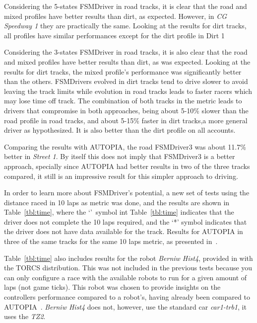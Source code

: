 Considering the 5-states FSMDriver in road tracks, it is clear that the road and mixed profiles have better results than dirt, as expected. However, in \emph{CG Speedway 1} they are practically the same.  Looking at the results for dirt tracks, all profiles have similar performances except for the dirt profile in Dirt 1 

Considering the 3-states FSMDriver in road tracks, it is also clear that the road and mixed profiles have better results than dirt, as was expected.  Looking at the results for dirt tracks, the mixed profile's performance was significantly better than the others. FSMDrivers evolved in dirt tracks tend to drive slower to avoid leaving the track limits while evolution in road tracks leads to faster racers which may lose time off track. The combination of both tracks in the metric leads to drivers that compromise in both approaches, being about 5-10\% slower than the road profile in road tracks, and about 5-15\% faster in dirt tracks,a more general driver as hypothesized. It is also better than the dirt profile on all accounts.

Comparing the results with AUTOPIA, the road FSMDriver3 was about 11.7\% better in \emph{Street 1}. By itself this does not imply that FSMDriver3 is a better approach, specially since AUTOPIA had better results in two of the three tracks compared, it still is an impressive result for this simpler approach to driving.

In order to learn more about FSMDriver's potential, a new set of tests using the distance raced in 10 laps as metric was done, and the results are shown in Table~\ref{tbl:time}, where the `\textdagger'~symbol int Table~\ref{tbl:time} indicates that the driver does not complete the 10 laps required, and the `*' symbol indicates that the driver does not have data available for the track. Results for AUTOPIA in three of the same tracks for the same 10 laps metric, as presented in~\cite{AUTOPIA}.

Table~\ref{tbl:time} also includes results for the robot \emph{Berniw Hist4}, provided in with the TORCS distribution. This was not included in the previous tests because you can only configure a race with the available robots to run for a given amount of laps (not game ticks). This robot was chosen to provide insights on the controllers performance compared to a robot's, having already been compared to AUTOPIA~\cite{AUTOPIA}. \emph{Berniw Hist4} does not, however, use the standard car \emph{car1-trb1}, it uses the \emph{TZ2}.

